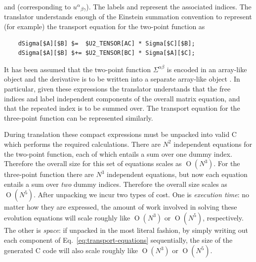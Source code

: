 \documentclass[11pt,a4paper]{article}
\renewcommand{\texttt}[1]{{\ttfamily\fontseries{l}\selectfont{#1}}}
\newcommand{\token}[1]{{\footnotesize\color{orange}\texttt{\textbf{{\$}#1}}}}
\newcommand{\indexset}[1]{{\footnotesize\color{orange}\texttt{\textbf{[#1]}}}}
\DeclareMathOperator{\Or}{O}
\newcommand\CC{C\nolinebreak\hspace{-.05em}\raisebox{.4ex}{\relsize{-3}{\textbf{+}}}\nolinebreak\hspace{-.10em}\raisebox{.4ex}{\relsize{-3}{\textbf{+}}}}
\begin{document}
and \token{U3\_TENSOR[ABC]} (corresponding to ${u^\alpha}_{\beta\gamma}$).
The labels \indexset{AB} and \indexset{ABC} represent the associated indices.
The translator understands enough of the Einstein summation convention
to represent (for example) the transport equation for the two-point function
as
\begin{verbatim}
    dSigma[$A][$B] $=  $U2_TENSOR[AC] * Sigma[$C][$B];
    dSigma[$A][$B] $+= $U2_TENSOR[BC] * Sigma[$A][$C];    
\end{verbatim}
It has been assumed that the two-point function $\Sigma^{\alpha\beta}$ is
encoded in an array-like object \texttt{Sigma[][]}
and the derivative is to be written into a separate
array-like object \texttt{dSigma[][]}.
In particular, given these expressions the translator
understands that the free indices
\indexset{A} and \indexset{B}
label independent components of the
overall matrix equation,
and that the repeated index \indexset{C} is to be summed over.
The transport equation for the three-point function can
be represented similarly.

During translation these compact expressions must be unpacked into
valid {\CC} which performs the required calculations.
There are $N^2$ independent equations for the two-point function,
each of which entails a sum over one dummy index.
Therefore the overall size for this set of equations scales as $\Or(N^3)$.
For the three-point function there are $N^3$ independent equations,
but now each equation entails a sum over \emph{two} dummy indices.
Therefore the overall size scales as $\Or(N^5)$.
After unpacking we incur two types of cost.
One is \emph{execution time}:
no matter how they are expressed, the amount of work
involved in solving these evolution
equations will scale roughly like $\Or(N^3)$ or $\Or(N^5)$, respectively.
The other is \emph{space}:
if unpacked in the most literal fashion,
by simply writing out each component of Eq.~\eqref{eq:transport-equations}
sequentially,
the size of the generated {\CC} code will also scale roughly like
$\Or(N^3)$ or $\Or(N^5)$.
\end{document}
